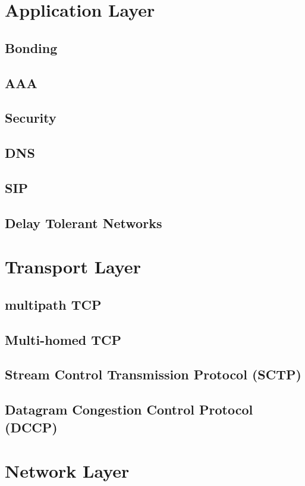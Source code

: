 \documentclass[journal]{IEEEtran}
\begin{document}
\section{Application Layer}
\subsection{Bonding}
\subsection{AAA}
\subsection{Security}
\subsection{DNS}
\subsection{SIP}
\subsection{Delay Tolerant Networks}

\section{Transport Layer}
\subsection{ multipath TCP }
\subsection{ Multi-homed TCP }
\subsection{Stream Control Transmission Protocol (SCTP)}
\subsection{Datagram Congestion Control Protocol (DCCP)}

\section{Network Layer}
\end{document}
